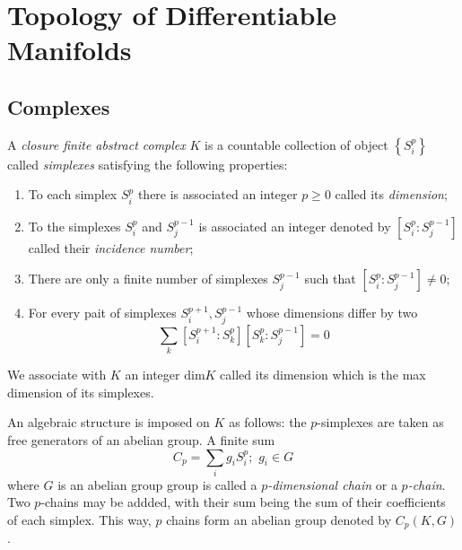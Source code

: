 \section{Topology of Differentiable Manifolds}
\subsection{Complexes}
\begin{defn}

	A \textit{closure finite abstract complex} $K$ is a countable collection of object $ \left\{ S^p_i \right\}$ called \textit{simplexes} satisfying the following properties:
	\begin{enumerate}
		\item To each simplex $S^p_i$ there is associated an integer $p \geq 0$ called its \textit{dimension};
		\item To the simplexes $S^p_i$ and $S^{ p-1 }_j$ is associated an integer denoted by $ \left[ S^p_i : S^{ p-1 }_j \right]$ called their \textit{incidence number};
		\item There are only a finite number of simplexes $ S^{ p-1 }_j$ such that $ \left[ S^p_i : S^{ p-1 }_j \right] \neq 0$;
		\item For every pait of simplexes $S^{ p+1 }_i, S^{ p-1 }_j$ whose dimensions differ by two
			\[
			\sum_k \left[ S^{ p+1 }_i : S^p_k \right] \left[ S^p_k : S^{ p-1 }_j \right] = 0
			\]
			
	\end{enumerate}
	We associate with $K$ an integer $ \mathrm{dim}K$ called its dimension which is the max dimension of its simplexes.

\end{defn}

\begin{defn}

	An algebraic structure is imposed on $K$ as follows: the $p$-simplexes are taken as free generators of an abelian group. A finite sum
	\[
		C_p = \sum_i g_i S^p_i; \hspace{4pt} g_i \in G
	\]
	where $G$ is an abelian group group is called a \textit{$p$-dimensional chain} or a \textit{$p$-chain}. Two $p$-chains may be addded, with their sum being the sum of their coefficients of each simplex. This way, $p$ chains form an abelian group denoted by $ C_p(K,G)$.

\end{defn}


